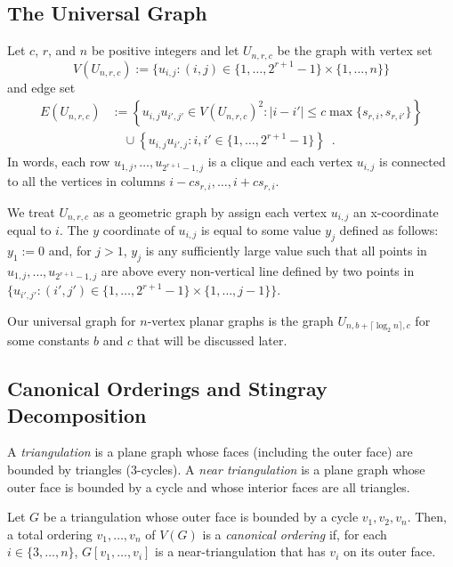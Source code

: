 \documentclass{patmorin}
\newcommand{\defin}[1]{\emph{\color{brightmaroon}#1}}
\begin{document}
\subsection{The Universal Graph}

Let $c$, $r$, and $n$ be positive integers and let $U_{n,r,c}$ be the graph with vertex set
\[
  V(U_{n,r,c}):=\{ u_{i,j}: (i,j)\in\{1,\ldots,2^{r+1}-1\}\times \{1,\ldots,n\}\}
\]
and edge set
\begin{align*}
  E(U_{n,r,c}) & := \left\{ u_{i,j}u_{i',j'} \in V(U_{n,r,c})^2: |i-i'| \le c\max\{s_{r,i},s_{r,i'}\}\right\} \\
  & \quad {}\cup\left\{u_{i,j}u_{i',j}:i,i'\in\{1,\ldots,2^{r+1}-1\}\right\}\enspace .
\end{align*}
In words, each row $u_{1,j},\ldots,u_{2^{r+1}-1,j}$ is a clique and each vertex $u_{i,j}$ is connected to all the vertices in columns $i-cs_{r,i},\ldots,i+cs_{r,i}$.

We treat $U_{n,r,c}$ as a geometric graph by assign each vertex $u_{i,j}$ an x-coordinate equal to $i$.  The $y$ coordinate of $u_{i,j}$ is equal to some value $y_j$ defined as follows:  $y_1:=0$ and, for $j>1$, $y_j$ is any sufficiently large value such that all points in $u_{1,j},\ldots,u_{2^{r+1}-1,j}$ are above every non-vertical line defined by two points in $\{u_{i',j'}:(i',j')\in\{1,\ldots,2^{r+1}-1\}\times\{1,\ldots,j-1\}\}$.

Our universal graph for $n$-vertex planar graphs is the graph $U_{n,b+\lceil\log_2 n\rceil,c}$ for some constants $b$ and $c$ that will be discussed later.

\subsection{Canonical Orderings and Stingray Decomposition}

A \defin{triangulation} is a plane graph whose faces (including the outer face) are bounded by triangles ($3$-cycles). A \defin{near triangulation} is a plane graph whose outer face is bounded by a cycle and whose interior faces are all triangles.

Let $G$ be a triangulation whose outer face is bounded by a cycle $v_1,v_2,v_n$.  Then, a total ordering $v_1,\ldots,v_n$ of $V(G)$ is a \defin{canonical ordering} if, for each $i\in\{3,\ldots,n\}$,  $G[v_1,\ldots,v_i]$ is a near-triangulation that has $v_i$ on its outer face.
\end{document}
